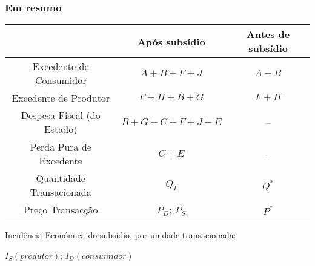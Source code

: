 \begin{frame}
\begin{center}
	\end{center}
\end{frame}

\begin{frame}
	\frametitle{Em resumo}
	\begin{center}
		{
		\renewcommand{\arraystretch}{1.5}
		\footnotesize
		\begin{tabular}{ccc}
		\rowcolor{iscal_color}	& {\color{white}\textbf{Ap\'os subs\'idio}} & {\color{white}\textbf{Antes de subs\'idio}} \\
		\hline
		\rowcolor{iscal_color!10!white} Excedente de Consumidor 	& $A+B+F+J$ 	& $A+B$ \\
		\rowcolor{iscal_color!20!white} Excedente de Produtor 		& $F+H+B+G$ 	& $F+H$ \\
		\rowcolor{iscal_color!10!white} Despesa Fiscal (do Estado)  & $B+G+C+F+J+E$ & --\\
		\rowcolor{iscal_color!20!white} Perda Pura de Excedente 	& $C+E$ 		& -- \\
		\rowcolor{iscal_color!10!white} Quantidade Transacionada 	& $Q_I$ 		& $Q^*$ \\
		\rowcolor{iscal_color!20!white} Pre\c co Transac\c c\~ao 	& $P_D$; $P_S$  & $P^*$
		\end{tabular}

		\vspace{0.3cm}

		Incid\^encia Econ\'omica do subs\'idio, por unidade transacionada:\par $I_S(produtor)$; $I_D(consumidor)$
		}
	\end{center}
\end{frame}

